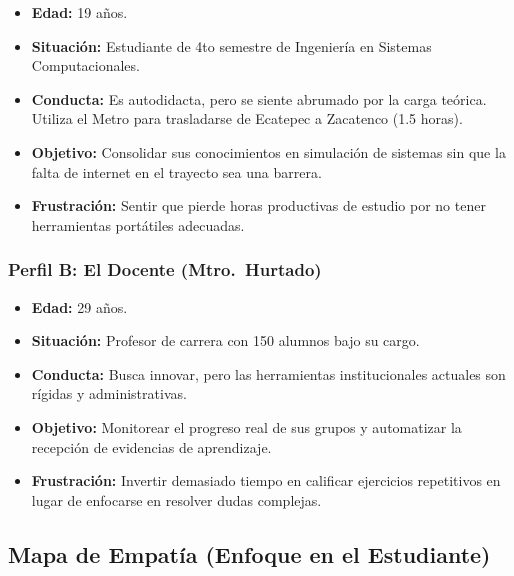 \begin{itemize}
    \item \textbf{Edad:} 19 años.
    \item \textbf{Situación:} Estudiante de 4to semestre de Ingeniería en Sistemas Computacionales.
    \item \textbf{Conducta:} Es autodidacta, pero se siente abrumado por la carga teórica. Utiliza
    el Metro para trasladarse de Ecatepec a Zacatenco (1.5 horas).
    \item \textbf{Objetivo:} Consolidar sus conocimientos en simulación de sistemas sin que la falta
    de internet en el trayecto sea una barrera.
    \item \textbf{Frustración:} Sentir que pierde horas productivas de estudio por no tener
    herramientas portátiles adecuadas.
\end{itemize}

\subsubsection*{Perfil B: El Docente (Mtro.\ Hurtado)}

\begin{itemize}
    \item \textbf{Edad:} 29 años.
    \item \textbf{Situación:} Profesor de carrera con 150 alumnos bajo su cargo.
    \item \textbf{Conducta:} Busca innovar, pero las herramientas institucionales actuales son
    rígidas y administrativas.
    \item \textbf{Objetivo:} Monitorear el progreso real de sus grupos y automatizar la recepción
    de evidencias de aprendizaje.
    \item \textbf{Frustración:} Invertir demasiado tiempo en calificar ejercicios repetitivos en
    lugar de enfocarse en resolver dudas complejas.
\end{itemize}

\subsection{Mapa de Empatía (Enfoque en el Estudiante)}
\label{subsec:mapa_empatia}

